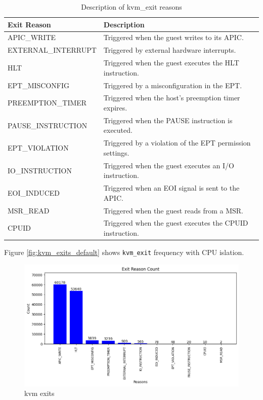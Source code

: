 \documentclass[MMR,Master,english]{twbook}
\begin{document}
\begin{table}[H]
  \centering
  \begin{tabular}{|l|p{}|}
  \hline
  \textbf{Exit Reason} & \textbf{Description}\\
  \hline
  APIC\_WRITE & Triggered when the guest writes to its APIC. \\ \hline
  EXTERNAL\_INTERRUPT & Triggered by external hardware interrupts. \\ \hline
  HLT & Triggered when the guest executes the HLT instruction. \\ \hline
  EPT\_MISCONFIG & Triggered by a misconfiguration in the EPT. \\ \hline
  PREEMPTION\_TIMER & Triggered when the host's preemption timer expires. \\ \hline
  PAUSE\_INSTRUCTION & Triggered when the PAUSE instruction is executed. \\ \hline
  EPT\_VIOLATION & Triggered by a violation of the EPT permission settings. \\ \hline
  IO\_INSTRUCTION & Triggered when the guest executes an I/O instruction. \\ \hline
  EOI\_INDUCED & Triggered when an EOI signal is sent to the APIC. \\ \hline
  MSR\_READ & Triggered when the guest reads from a MSR. \\ \hline
  CPUID & Triggered when the guest executes the CPUID instruction.  \\ \hline
  \end{tabular}
  \caption{Description of kvm\_exit reasons}
  \label{tab:kvm_exit}
  \end{table}

\clearpage
  Figure \ref{fig:kvm_exits_default} shows \texttt{kvm\_exit} frequency with CPU islation.
  \begin{figure}[H]
    \centering
    \includegraphics[width=1.0\columnwidth]{img/kvm_exits.png}
    \caption[kvm exits]{kvm exits}
    \label{fig:kvm_exits}
  \end{figure}
\end{document}
